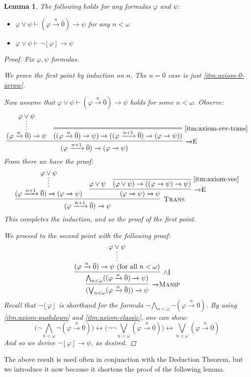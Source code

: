 \documentclass{amsart}
\newtheorem{lemma}[theorem]{Lemma}
\theoremstyle{definition}
\numberwithin{equation}{theorem}
\renewcommand{\phi}{\varphi}
\newcommand{\unwedge}{{\wedge}}
\newcommand{\proves}{\vdash}
\newcommand{\strict}[1]{{\left\lfloor#1\right\rfloor}}
\newcommand{\rat}[1]{{\overline{#1}}}
\newcommand{\narrow}[1]{\xrightarrow{#1}}
\renewcommand{\to}{\narrow{}}
\newcommand{\arr}{{\to}}
\newcommand{\intro}{\!\operatorname{I}}
\newcommand{\elim}{\!\operatorname{E}}
\newcommand{\trans}{\text{\sc{Trans}}}
\newcommand{\aref}[1]{\!\text{\ref{itm:axiom-#1}}}
\newcommand{\pushdown}{\arr\text{\sc{Manip}}}
\begin{document}
\begin{lemma}\label{lem:vee-with-strict}
  The following holds for any formulas $\phi$ and $\psi$:
  \begin{itemize}
  \item $\phi\vee\psi\proves(\phi\narrow n\rat 0)\to\psi$ for any $n<\omega$
  \item $\phi\vee\psi\proves\neg\strict\phi\to\psi$
  \end{itemize}
  \begin{proof}    
    Fix $\phi,\psi$ formulas.
    
    We prove the first point by induction on $n$.
    The $n=0$ case is just \ref{itm:axiom-0-arrow}.
    
    Now assume that $\phi\vee\psi\proves(\phi\narrow n\rat 0)\to\psi$ holds for some $n<\omega$.
    Observe:
    \[
      \infer[\arr\elim]{(\phi\narrow{n+1}\rat 0)\to(\phi\to\psi)}{
        \infer*{(\phi\narrow n\rat 0)\to\psi}{\phi\vee\psi} &
        \infer=[\aref{rev-trans}]{((\phi\narrow n\rat 0)\to\psi)\to((\phi\narrow{n+1}\rat 0)\to(\phi\to\psi))}{}
      }
    \]
    From there we have the proof:
    \[
      \infer[\trans]{(\phi\narrow{n+1}\rat 0)\to\psi}{
        \infer*{(\phi\narrow{n+1}\rat 0)\to(\phi\to\psi)}{\phi\vee\psi} &
        \infer[\arr\elim]{(\phi\to\psi)\to\psi}{
          \phi\vee\psi &
          \infer[\aref{vee}]{(\phi\vee\psi)\to((\phi\to\psi)\to\psi)}{}
        }
      }
    \]
    This completes the induction, and so the proof of the first point.
    
    We proceed to the second point with the following proof:
    \[
      \infer[\pushdown]{(\bigvee_{n<\omega}(\phi\narrow n\rat 0))\to\psi}{
        \infer[\unwedge\intro]{\bigwedge_{n<\omega}((\phi\narrow n\rat 0)\to\psi)}{
		      \infer*{(\phi\narrow n\rat 0)\to\psi\text{ (for all $n<\omega$)}}{\phi\vee\psi}
	      }
      }
    \]
    Recall that $\neg\strict\phi$ is shorthand for the formula $\neg\bigwedge_{n<\omega}\neg(\phi\narrow n\rat0)$.
    By using \ref{itm:axiom-pushdown} and \ref{itm:axiom-classic}, one can show:
    \[
      \Big(\neg\bigwedge_{n<\omega}\neg(\phi\narrow n\rat0)\Big)\leftrightarrow\Big(\neg\neg\bigvee_{n<\omega}(\phi\narrow n\rat 0)\Big)\leftrightarrow\bigvee_{n<\omega}(\phi\narrow n\rat 0)
    \]
    And so we derive $\neg\strict\phi\to\psi$, as desired.
  \end{proof}
\end{lemma}
The above result is used often in conjunction with the Deduction Theorem, but we introduce it now because it shortens the proof of the following lemma.
\end{document}
